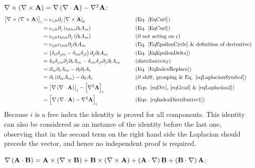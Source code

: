  
$\nabla\times\left(\nabla\times\mathbf{ A}\right)=\nabla\left(\nabla\cdot\mathbf{ 
A}\right)-\nabla^{2}\mathbf{ A}$:
\begin{equation}
\begin{aligned}\left[\nabla\times\left(\nabla\times\mathbf{ A}\right)\right]_{i} 
& =\epsilon_{ijk}\partial_{j}\left[\nabla\times\mathbf{ A}\right]_{k} & 
\,\,\,\,\,\,\,\,\,\,\, & \text{(Eq. \ref{EqCurl})}\\
 & =\epsilon_{ijk}\partial_{j}\left(\epsilon_{klm}\partial_{l}A_{m}\right) &  & 
\text{(Eq. \ref{EqCurl})}\\
 & =\epsilon_{ijk}\epsilon_{klm}\partial_{j}\left(\partial_{l}A_{m}\right) &  & 
\text{(\ensuremath{\partial} not acting on \ensuremath{\epsilon})}\\
 & =\epsilon_{ijk}\epsilon_{lmk}\partial_{j}\partial_{l}A_{m} &  & \text{(Eq. 
\ref{EqEpsilonCycle} \& definition of derivative)}\\
 & 
=\left(\delta_{il}\delta_{jm}-\delta_{im}\delta_{jl}\right)\partial_{j}\partial_
{l}A_{m} &  & \text{(Eq. \ref{EqEpsilonDelta})}\\
 & 
=\delta_{il}\delta_{jm}\partial_{j}\partial_{l}A_{m}-\delta_{im}\delta_{jl}
\partial_{j}\partial_{l}A_{m} &  & \text{(distributivity)}\\
 & =\partial_{m}\partial_{i}A_{m}-\partial_{l}\partial_{l}A_{i} &  & \text{(Eq. 
\ref{EqIndexReplace})}\\
 & =\partial_{i}\left(\partial_{m}A_{m}\right)-\partial_{ll}A_{i} &  & 
\text{(\ensuremath{\partial}\ shift, grouping \& Eq. \ref{eqLaplacianSymbol})}\\
 & 
=\left[\nabla\left(\nabla\cdot\mathbf{ A}\right)\right]_{i}-\left[\nabla^{2}
\mathbf{ A}\right]_{i} &  & \text{(Eqs. \ref{eqDiv}, \ref{eqGrad} \& 
\ref{eqLaplacian2})}\\
 & 
=\left[\nabla\left(\nabla\cdot\mathbf{ A}\right)-\nabla^{2}\mathbf{ A}\right]_{i} 
&  & \text{(Eqs. \ref{eqIndexDistributive1})}
\end{aligned}
\end{equation}
Because $i$ is a free index the identity is proved for all components.
This identity can also be considered as an instance of the identity
before the last one, observing that in the second term on the right
hand side the Laplacian should precede the vector, and hence no independent
proof is required.

 
$\nabla\left(\mathbf{ A}\cdot\mathbf{ B}\right)=\mathbf{ A}
\times\left(\nabla\times\mathbf{ B}\right)+\mathbf{ B}
\times\left(\nabla\times\mathbf{ A}\right)+\left(\mathbf{ A}
\cdot\nabla\right)\mathbf{ B}+\left(\mathbf{ B}\cdot\nabla\right)\mathbf{ A}$:

